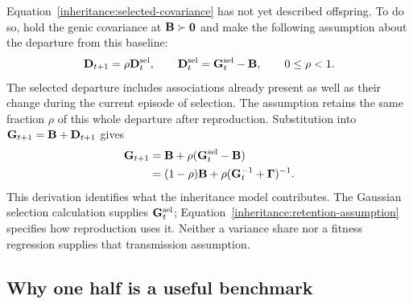 Equation~\eqref{inheritance:selected-covariance} has not yet described
offspring. To do so, hold the genic covariance at $\mathbf{B}\succ\mathbf{0}$ and
make the following assumption about the departure from this baseline:
\begin{equation}
  \mathbf{D}_{t+1}=\rho\mathbf{D}_t^{\mathrm{sel}},
  \qquad
  \mathbf{D}_t^{\mathrm{sel}}=\mathbf{G}_t^{\mathrm{sel}}-\mathbf{B},
  \qquad 0\leq\rho<1.
  \label{inheritance:retention-assumption}
\end{equation}
The selected departure includes associations already present as well as
their change during the current episode of selection. The assumption retains
the same fraction $\rho$ of this whole departure after reproduction.
Substitution into $\mathbf{G}_{t+1}=\mathbf{B}+\mathbf{D}_{t+1}$ gives
\begin{align}
  \mathbf{G}_{t+1}
    &=\mathbf{B}+\rho(\mathbf{G}_t^{\mathrm{sel}}-\mathbf{B})\\
    &=(1-\rho)\mathbf{B}+
                    \rho(\mathbf{G}_t^{-1}+\boldsymbol{\Gamma})^{-1}.
  \label{inheritance:recursion}
\end{align}
This derivation identifies what the inheritance model contributes. The
Gaussian selection calculation supplies $\mathbf{G}_t^{\mathrm{sel}}$;
Equation~\eqref{inheritance:retention-assumption} specifies how reproduction
uses it. Neither a variance share nor a fitness regression supplies that
transmission assumption.

\subsection{Why one half is a useful benchmark}
\label{inheritance:half-retention}

